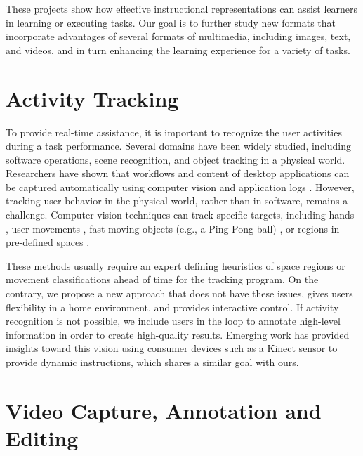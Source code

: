 These projects show how effective instructional representations can assist learners in learning or executing tasks. Our goal is to further study new formats that incorporate advantages of several formats of multimedia, including images, text, and videos, and in turn enhancing the learning experience for a variety of tasks.


\section{Activity Tracking}
To provide real-time assistance, it is important to recognize the user activities during a task performance. Several domains have been widely studied, including software operations, scene recognition, and object tracking in a physical world.
%
Researchers have shown that workflows and content of desktop applications can be captured automatically using computer vision \cite{Yeh:2009dh,Chang:2011vd} and application logs \cite{Grossman:2010jz,Grabler:2009jj,Pongnumkul:2011ju}.
%
However, tracking user behavior in the physical world, rather than in software, remains a challenge. Computer vision techniques can track specific targets, including hands \cite{Ranjan:2008}, user movements \cite{Wilson:2012fb}, fast-moving objects (e.g., a Ping-Pong ball) \cite{Okumura:2011tr}, or regions in pre-defined spaces \cite{Ranjan:2007}.

These methods usually require an expert defining heuristics of space regions or movement classifications ahead of time for the tracking program.
%
On the contrary, we propose a new approach that does not have these issues, gives users flexibility in a home environment, and provides interactive control. If activity recognition is not possible, we include users in the loop to annotate high-level information in order to create high-quality results.
%
Emerging work has provided insights toward this vision using consumer devices such as a Kinect sensor \cite{Anderson:2013:YEM:2501988.2502045,Gupta:2012ku} to provide dynamic instructions, which shares a similar goal with ours.


\section{Video Capture, Annotation and Editing}

